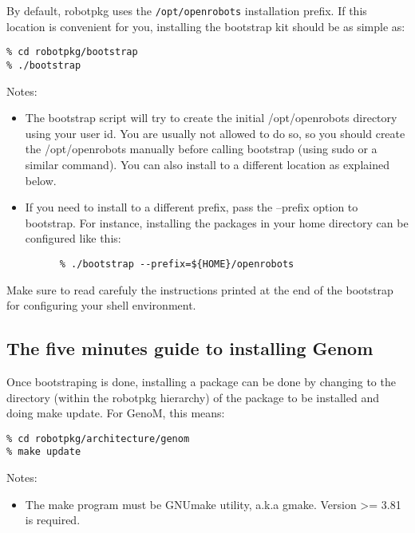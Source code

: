 By default, robotpkg uses the \texttt{/opt/openrobots} installation prefix. If
this location is convenient for you, installing the bootstrap kit
should be as simple as:

\begin{cartouche}
\begin{verbatim}
% cd robotpkg/bootstrap
% ./bootstrap
\end{verbatim}
\end{cartouche}

Notes:
\begin{itemize}
\item The bootstrap script will try to create the initial
  /opt/openrobots directory using your user id. You are usually not
  allowed to do so, so you should create the /opt/openrobots manually
  before calling bootstrap (using sudo or a similar command). You can
  also install to a different location as explained below. 

\item If you need to install to a different prefix, pass the --prefix
  option to bootstrap. For instance, installing the packages in your
  home directory can be configured like this: 

\begin{cartouche}
\begin{verbatim}
      % ./bootstrap --prefix=${HOME}/openrobots
\end{verbatim}
\end{cartouche}
\end{itemize}

Make sure to read carefuly the instructions printed at the end of the bootstrap for configuring your shell environment.

\subsection{The five minutes guide to installing Genom}

Once bootstraping is done, installing a package can be done by
changing to the directory (within the robotpkg hierarchy) of the
package to be installed and doing make update. For GenoM, this means:

\begin{cartouche}
\begin{verbatim}
% cd robotpkg/architecture/genom
% make update
\end{verbatim}
\end{cartouche}


Notes:
\begin{itemize}
\item The make program must be GNUmake utility, a.k.a gmake. Version
  >= 3.81 is required.  
\end{itemize}

